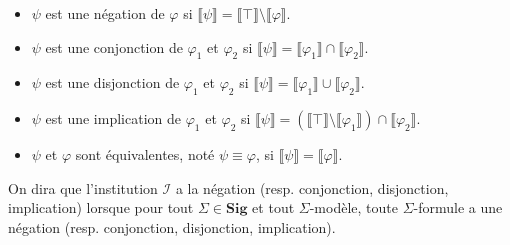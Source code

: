 \documentclass[11pt,a4paper]{report}
\newcommand{\ph}{\varphi}
\newcommand{\gr}{\textbf}
\newcommand{\I}{\mathcal{I}}
\newcommand{\lb}{\llbracket}
\newcommand{\rb}{\rrbracket}
\newcommand{\1}{\mathbbm{1}}
\begin{document}
\begin{itemize}
\setlength\itemsep{-0.3em}
\item $\psi$ est une négation de $\ph$ si $\lb \psi \rb = \lb \top \rb \setminus \lb \ph \rb$.
\item $\psi$ est une conjonction de $\ph_1$ et $\ph_2$ si $\lb \psi \rb = \lb \ph_1 \rb \cap \lb \ph_2 \rb$.
\item $\psi$ est une disjonction de $\ph_1$ et $\ph_2$ si $\lb \psi \rb = \lb \ph_1 \rb \cup \lb \ph_2 \rb$.
\item $\psi$ est une implication de $\ph_1$ et $\ph_2$ si $\lb \psi \rb = (\lb \top \rb \setminus \lb \ph_1 \rb) \cap \lb \ph_2 \rb$.
\item $\psi$ et $\ph$ sont équivalentes, noté $\psi \equiv \ph$, si $\lb \psi \rb = \lb \ph \rb$.
\end{itemize}
On dira que l'institution $\I$ a la négation (resp. conjonction, disjonction, implication) lorsque pour tout $\Sigma \in \gr{Sig}$ et tout $\Sigma$-modèle, toute $\Sigma$-formule a une négation (resp. conjonction, disjonction, implication).
\end{document}
